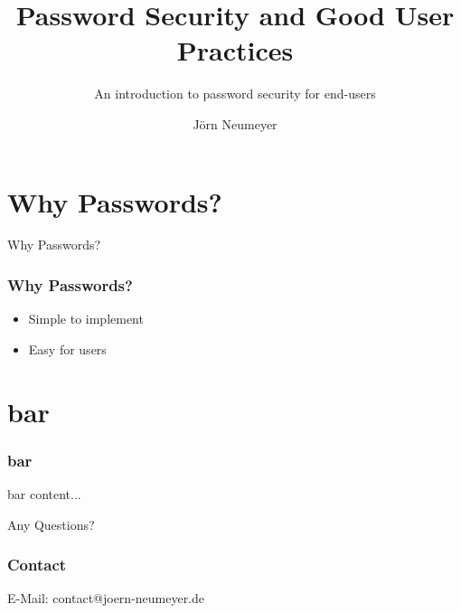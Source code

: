 \documentclass{beamer}
\title[Password Security]{Password Security and Good User Practices}
\subtitle{An introduction to password security for end-users}
\author{J\"orn Neumeyer}
\begin{document}
  \frame{\titlepage}
  \section{Why Passwords?}
  \begin{frame}
    \begin{center}
      \Huge Why Passwords?
    \end{center}
  \end{frame}
  \begin{frame}
    \frametitle{Why Passwords?}
    \begin{itemize}
      \item<1-> Simple to implement
      \item<2-> Easy for users
    \end{itemize}
  \end{frame}

  \section{bar}
  \begin{frame}
    \frametitle{bar}
    bar content...
  \end{frame}

  \begin{frame}
    \begin{center}
      \Huge Any Questions?
    \end{center}
  \end{frame}

  \begin{frame}
    \frametitle{Contact}
    \begin{center}
      \Large E-Mail: contact@joern-neumeyer.de
    \end{center}
  \end{frame}
\end{document}
